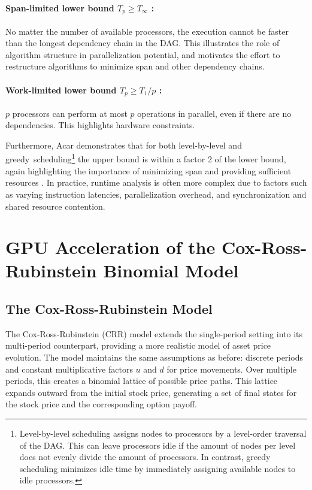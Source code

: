 \documentclass[english,12pt,a4paper,pdftex,sci,utf8]{aaltothesis}
\begin{document}
\paragraph{Span-limited lower bound $T_p \geq T_\infty$ :} No matter the number of available processors, the execution cannot be faster than the longest dependency chain in the DAG. This illustrates the role of algorithm structure in parallelization potential, and motivates the effort to restructure algorithms to minimize span and other dependency chains.

\paragraph{Work-limited lower bound $T_p \geq T_1/p$ :} $p$ processors can perform at most $p$ operations in parallel, even if there are no dependencies. This highlights hardware constraints.

Furthermore, Acar demonstrates that for both level-by-level and \mbox{greedy scheduling}\footnote{Level-by-level scheduling assigns nodes to processors by a level-order traversal of the DAG. This can leave processors idle if the amount of nodes per level does not evenly divide the amount of processors. In contrast, greedy scheduling minimizes idle time by immediately assigning available nodes to idle processors.} the upper bound is within a factor 2 of the lower bound, again highlighting the importance of minimizing span and providing sufficient resources \cite{acar2016parallel}. In practice, runtime analysis is often more complex due to factors such as varying instruction latencies, parallelization overhead, and synchronization and shared resource contention.
\clearpage

\section{GPU Acceleration of the Cox-Ross-Rubinstein Binomial Model} \label{sec:gpu-crr}

\subsection{The Cox-Ross-Rubinstein Model}

The Cox-Ross-Rubinstein (CRR) model \cite{cox1979option} extends the single-period setting into its multi-period counterpart, providing a more realistic model of asset price evolution. The model maintains the same assumptions as before: discrete periods and constant multiplicative factors $u$ and $d$ for price movements. Over multiple periods, this creates a binomial lattice of possible price paths. This lattice expands outward from the initial stock price, generating a set of final states for the stock price and the corresponding option payoff.
\end{document}
